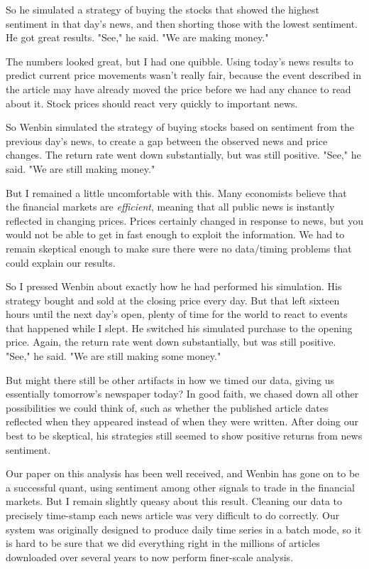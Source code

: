 \documentclass[10pt]{article}
\begin{document}
So he simulated a strategy of buying the stocks that showed the highest
sentiment in that day's news, and then shorting those with the lowest sentiment. He got great results. "See," he said. "We are making money."

The numbers looked great, but I had one quibble. Using today's news results to predict current price movements wasn't really fair, because the event described in the article may have already moved the price before we had any chance to read about it. Stock prices should react very quickly to important news.

So Wenbin simulated the strategy of buying stocks based on sentiment from the previous day's news, to create a gap between the observed news and price changes. The return rate went down substantially, but was still positive. "See," he said. "We are still making money."

But I remained a little uncomfortable with this. Many economists believe that the financial markets are \textit{efficient}, meaning that all public news is instantly reflected in changing prices. Prices certainly changed in response to news, but you would not be able to get in fast enough to exploit the information. We had to remain skeptical enough to make sure there were no data/timing problems that could explain our results.

So I pressed Wenbin about exactly how he had performed his simulation. His strategy bought and sold at the closing price every day. But that left sixteen hours until the next day's open, plenty of time for the world to react to events that happened while I slept. He switched his simulated purchase to the opening price. Again, the return rate went down substantially, but was still positive. "See," he said. "We are still making some money."

But might there still be other artifacts in how we timed our data, giving us essentially tomorrow's newspaper today? In good faith, we chased down all other possibilities we could think of, such as whether the published article dates reflected when they appeared instead of when they were written. After doing our best to be skeptical, his strategies still seemed to show positive returns from news sentiment.

Our paper on this analysis \cite{ZS10} has been well received, and Wenbin has gone on to be a successful quant, using sentiment among other signals to trade in the financial markets. But I remain slightly queasy about this result. Cleaning our data to precisely time-stamp each news article was very difficult to do correctly. Our system was originally designed to produce daily time series in a batch mode, so it is hard to be sure that we did everything right in the millions of articles downloaded over several years to now perform finer-scale analysis.
\end{document}
